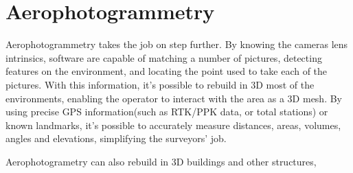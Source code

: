 \section{Aerophotogrammetry}

Aerophotogrammetry takes the job on step further. By knowing the cameras lens intrinsics, software are capable of matching a number of pictures, detecting features on the environment, and locating the point used to take each of the pictures. With this information, it's possible to rebuild in 3D most of the environments, enabling the operator to interact with the area as a 3D mesh.
By using precise GPS information(such as RTK/PPK data, or total stations) or known landmarks, it's possible to accurately measure distances, areas, volumes, angles and elevations, simplifying the surveyors' job.

Aerophotogrametry can also rebuild in 3D buildings and other structures, 